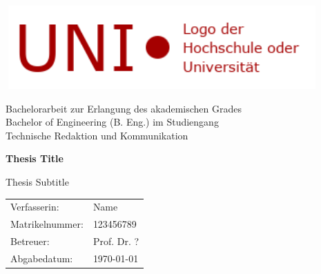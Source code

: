 \begin{titlepage}
			
			\vspace*{1cm}
			
			\begin{center}
				\includegraphics[height=32mm,width=120mm]{logos/Logo.png}
			\vspace*{1cm}
			\begin{center}
				\large{Bachelorarbeit zur Erlangung des akademischen Grades\\
					 Bachelor of Engineering (B. Eng.) im Studiengang\\ Technische Redaktion und Kommunikation}
			\end{center}
		
			\vspace*{1cm}
		
			\begin{center}
				\huge{\textbf{Thesis Title}}
				\end{center}
				\vspace{0.5cm}
				\large{Thesis Subtitle}
				
				\vspace{1.5cm}
				
				\vfill
							
				\vspace{0.8cm}
			
			\end{center}			
			\begin{tabular}{ll}			
			Verfasserin:& Name\\
			Matrikelnummer:& 123456789\\
			Betreuer:& Prof. Dr. ?\\
			Abgabedatum:& \today
			\end{tabular}
	\end{titlepage}
